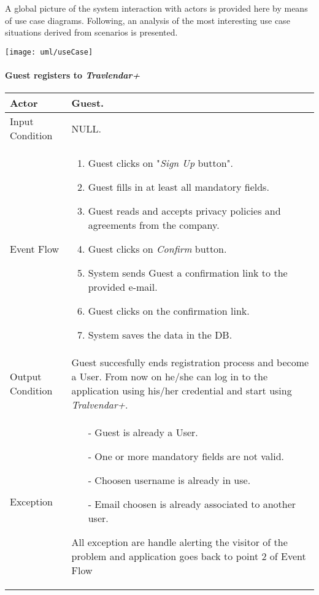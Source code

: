 A global picture of the system interaction with actors is provided here by means of use case diagrams. Following, an analysis of the most interesting use case situations derived from scenarios is presented.

	\texttt{[image: uml/useCase]}

	\paragraph{Guest registers to \textit{Travlendar+}} \label{register_useCase}
	
		\begin{tabular}{| l | p{} | }
			\hline
			\hline
			Actor	&		Guest. \\
			\hline
			Input Condition		&		NULL. \\
			\hline
			Event Flow		&		\begin{enumerate}
												\item Guest clicks on "\textit{Sign Up} button".
												\item Guest fills in at least all mandatory fields.
												\item Guest reads and accepts privacy policies and agreements from the company.
												\item Guest clicks on \textit{Confirm} button.
												\item System sends Guest a confirmation link to the provided e-mail.
												\item Guest clicks on the confirmation link.
												\item	 System saves the data in the DB.
											\end{enumerate} \\
			\hline
			Output Condition		&		Guest succesfully ends registration process and become a User. From now on he/she can log in to the application using his/her credential and start using \textit{Tralvendar+}. \\
			\hline		
			Exception		&		\begin{itemize}
											\item[-] Guest is already a User.
											\item[-] One or more mandatory fields are not valid.
											\item[-] Choosen username is already in use.
											\item[-] Email choosen is already associated to another user.
										\end{itemize}
										All exception are handle alerting the visitor of the problem and application goes back to point 2 of Event Flow \\
			\hline
			\hline
		\end{tabular}

